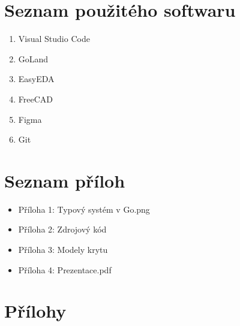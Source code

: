 \documentclass[czech,12pt,a4paper]{article}
\begin{document}
\section{Seznam použitého softwaru}

\begin{enumerate}
	\item Visual Studio Code
	\item GoLand
	\item EasyEDA
	\item FreeCAD
	\item Figma
	\item Git
\end{enumerate}

\section{Seznam příloh}

\begin{itemize}
	\item Příloha 1: Typový systém v Go.png
	\item Příloha 2: Zdrojový kód
	\item Příloha 3: Modely krytu
	\item Příloha 4: Prezentace.pdf
\end{itemize}

\section{Přílohy}
\end{document}
